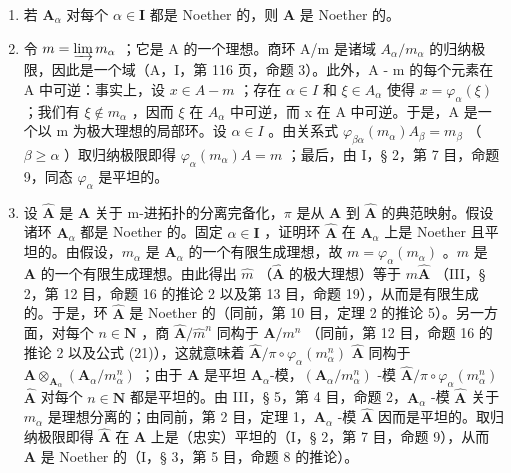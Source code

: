 \begin{enumerate}
\def\labelenumi{\alph{enumi})}
\setcounter{enumi}{1}
\item
  若 \(\mathbf{A}_{\alpha}\) 对每个 \(\alpha \in \mathbf{I}\) 都是 Noether 的，则 \(\mathbf{A}\) 是 Noether 的。
\item
  令 \(m = \varinjlim m_{\alpha}\) ；它是 A 的一个理想。商环 A/m 是诸域 \(A_{\alpha}/m_{\alpha}\) 的归纳极限，因此是一个域（A，I，第 116 页，命题 3）。此外，A - m 的每个元素在 A 中可逆：事实上，设 \(x \in A - m\) ；存在 \(\alpha \in I\) 和 \(\xi \in A_{\alpha}\) 使得 \(x = \varphi_{\alpha}(\xi)\) ；我们有 \(\xi \notin m_{\alpha}\) ，因而 \(\xi\) 在 \(A_{\alpha}\) 中可逆，而 x 在 A 中可逆。于是，A 是一个以 m 为极大理想的局部环。设 \(\alpha \in I\) 。由关系式 \(\varphi_{\beta\alpha}(m_{\alpha}) A_{\beta} = m_{\beta}\) （\(\beta \geqslant \alpha\) ）取归纳极限即得 \(\varphi_{\alpha}(m_{\alpha}) A = m\) ；最后，由 I，§ 2，第 7 目，命题 9，同态 \(\varphi_{\alpha}\) 是平坦的。
\item
  设 \(\hat{\mathbf{A}}\) 是 \(\mathbf{A}\) 关于 m-进拓扑的分离完备化，\(\pi\) 是从 \(\mathbf{A}\) 到 \(\hat{\mathbf{A}}\) 的典范映射。假设诸环 \(\mathbf{A}_{\alpha}\) 都是 Noether 的。固定 \(\alpha \in \mathbf{I}\) ，证明环 \(\hat{\mathbf{A}}\) 在 \(\mathbf{A}_{\alpha}\) 上是 Noether 且平坦的。由假设，\(m_{\alpha}\) 是 \(\mathbf{A}_{\alpha}\) 的一个有限生成理想，故 \(m = \varphi_{\alpha}(m_{\alpha})\) 。\(m\) 是 \(\mathbf{A}\) 的一个有限生成理想。由此得出 \(\hat{m}\) （\(\hat{\mathbf{A}}\) 的极大理想）等于 \(m\hat{\mathbf{A}}\) （III，§ 2，第 12 目，命题 16 的推论 2 以及第 13 目，命题 19），从而是有限生成的。于是，环 \(\hat{\mathbf{A}}\) 是 Noether 的（同前，第 10 目，定理 2 的推论 5）。另一方面，对每个 \(n \in \mathbf{N}\) ，商 \(\hat{\mathbf{A}}/\hat{m}^{n}\) 同构于 \(\mathbf{A}/m^{n}\) （同前，第 12 目，命题 16 的推论 2 以及公式 (21)），这就意味着 \(\hat{\mathbf{A}}/\pi \circ \varphi_{\alpha}(m_{\alpha}^{n})\) \(\hat{\mathbf{A}}\) 同构于 \(\mathbf{A} \otimes_{\mathbf{A}_{\alpha}} (\mathbf{A}_{\alpha}/m_{\alpha}^{n})\) ；由于 \(\mathbf{A}\) 是平坦 \(\mathbf{A}_{\alpha}\)-模，\((\mathbf{A}_{\alpha}/m_{\alpha}^{n})\) -模 \(\hat{\mathbf{A}}/\pi \circ \varphi_{\alpha}(m_{\alpha}^{n})\) \(\hat{\mathbf{A}}\) 对每个 \(n \in \mathbf{N}\) 都是平坦的。由 III，§ 5，第 4 目，命题 2，\(\mathbf{A}_{\alpha}\) -模 \(\hat{\mathbf{A}}\) 关于 \(m_{\alpha}\) 是理想分离的；由同前，第 2 目，定理 1，\(\mathbf{A}_{\alpha}\) -模 \(\hat{\mathbf{A}}\) 因而是平坦的。取归纳极限即得 \(\hat{\mathbf{A}}\) 在 \(\mathbf{A}\) 上是（忠实）平坦的（I，§ 2，第 7 目，命题 9），从而 \(\mathbf{A}\) 是 Noether 的（I，§ 3，第 5 目，命题 8 的推论）。
\end{enumerate}

